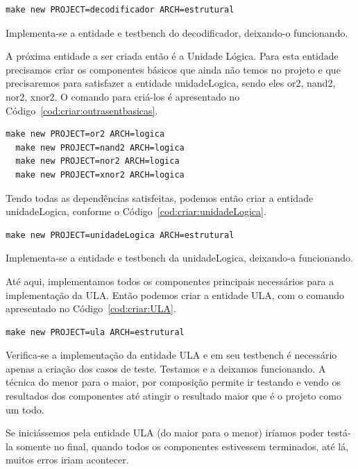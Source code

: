 \documentclass[a4paper,11pt]{report}
\begin{document}
\lstset{numbers=left, numberstyle=\tiny, stepnumber=1, numbersep=3pt}
\begin{lstlisting}[label=cod:criar:decodificador,caption=Comando para a criar a entidade Decodificador.]
  make new PROJECT=decodificador ARCH=estrutural
\end{lstlisting}

Implementa-se a entidade e testbench do decodificador, deixando-o funcionando.

A próxima entidade a ser criada então é a Unidade Lógica. Para esta entidade precisamos criar os componentes básicos que ainda não temos no projeto e que precisaremos para satisfazer a entidade unidadeLogica, sendo eles or2, nand2, nor2, xnor2. O comando para criá-los é apresentado no Código~\ref{cod:criar:outrasentbasicas}.

\lstset{numbers=left, numberstyle=\tiny, stepnumber=1, numbersep=3pt}
\begin{lstlisting}[label=cod:criar:outrasentbasicas,caption=Comando para a criar entidades básicas para a Unidade Lógica.]
  make new PROJECT=or2 ARCH=logica
  make new PROJECT=nand2 ARCH=logica
  make new PROJECT=nor2 ARCH=logica
  make new PROJECT=xnor2 ARCH=logica
\end{lstlisting}

Tendo todas as dependências satisfeitas, podemos então criar a entidade unidadeLogica, conforme o Código~\ref{cod:criar:unidadeLogica}.

\lstset{numbers=left, numberstyle=\tiny, stepnumber=1, numbersep=3pt}
\begin{lstlisting}[label=cod:criar:unidadeLogica,caption=Comando para a criar a entidade unidadeLogica.]
  make new PROJECT=unidadeLogica ARCH=estrutural
\end{lstlisting}

Implementa-se a entidade e testbench da unidadeLogica, deixando-a funcionando.

Até aqui, implementamos todos os componentes principais necessários para a implementação da ULA. Então podemos criar a entidade ULA, com o comando apresentado no Código~\ref{cod:criar:ULA}.

\lstset{numbers=left, numberstyle=\tiny, stepnumber=1, numbersep=3pt}
\begin{lstlisting}[label=cod:criar:ULA,caption=Comando para a criar a entidade ULA.]
  make new PROJECT=ula ARCH=estrutural
\end{lstlisting}

Verifica-se a implementação da entidade ULA e em seu testbench é necessário apenas a criação dos casos de teste. Testamos e a deixamos funcionando.
A técnica do menor para o maior, por composição permite ir testando e vendo os resultados dos componentes até atingir o resultado maior que é o projeto como um todo.

Se iniciássemos pela entidade ULA (do maior para o menor) iríamos poder testá-la somente no final, quando todos os componentes estivessem terminados, até lá, muitos erros iriam acontecer.
\end{document}
